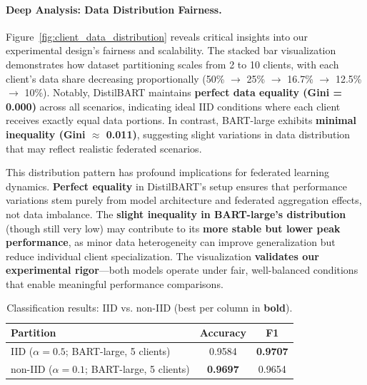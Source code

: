 \documentclass[conference]{IEEEtran}
\begin{document}
\paragraph{Deep Analysis: Data Distribution Fairness.} Figure~\ref{fig:client_data_distribution} reveals critical insights into our experimental design's fairness and scalability. The stacked bar visualization demonstrates how dataset partitioning scales from 2 to 10 clients, with each client's data share decreasing proportionally (50\% $\rightarrow$ 25\% $\rightarrow$ 16.7\% $\rightarrow$ 12.5\% $\rightarrow$ 10\%). Notably, DistilBART maintains \textbf{perfect data equality (Gini = 0.000)} across all scenarios, indicating ideal IID conditions where each client receives exactly equal data portions. In contrast, BART-large exhibits \textbf{minimal inequality (Gini $\approx$ 0.011)}, suggesting slight variations in data distribution that may reflect realistic federated scenarios.

This distribution pattern has profound implications for federated learning dynamics. \textbf{Perfect equality} in DistilBART's setup ensures that performance variations stem purely from model architecture and federated aggregation effects, not data imbalance. The \textbf{slight inequality in BART-large's distribution} (though still very low) may contribute to its \textbf{more stable but lower peak performance}, as minor data heterogeneity can improve generalization but reduce individual client specialization. The visualization \textbf{validates our experimental rigor}—both models operate under fair, well-balanced conditions that enable meaningful performance comparisons.

\begin{table}[H]
    \centering
    \caption{Classification results: IID vs. non-IID (best per column in \textbf{bold}).}
    \label{tab:cls_iid_vs_noniid}
    \begin{tabular}{lcc}
        \hline
        Partition & Accuracy & F1 \\
        \hline
        IID ($\alpha{=}0.5$; BART-large, 5 clients) & 0.9584 & \textbf{0.9707} \\
        non-IID ($\alpha{=}0.1$; BART-large, 5 clients) & \textbf{0.9697} & 0.9654 \\
        \hline
    \end{tabular}
\end{table}
\end{document}
